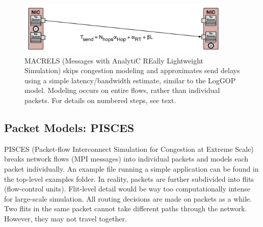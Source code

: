 \begin{figure}
\centering
\includegraphics[width=0.9\textwidth]{figures/macrels.pdf}
\caption{MACRELS (Messages with AnalytiC REally Lightweight Simulation) skips congestion modeling and approximates send delays using a simple latency/bandwidth estimate, similar to the LogGOP model. Modeling occurs on entire flows, rather than individual packets. For details on numbered steps, see text.}
\label{fig:macrelsOverview}
\end{figure}


\subsection{Packet Models: PISCES}
\label{subsec:tutorial:pisces}

PISCES (Packet-flow Interconnect Simulation for Congestion at Extreme Scale) breaks network flows (MPI messages) into individual packets and models each packet individually.
An example file running a simple application can be found in the top-level examples folder.
In reality, packets are further subdivided into flits (flow-control units).
Flit-level detail would be way too computationally intense for large-scale simulation.
All routing decisions are made on packets as a while. 
Two flits in the same packet cannot take different paths through the network.
However, they may not travel together.

